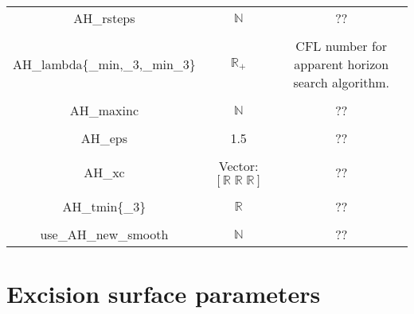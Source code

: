 \documentclass{article}
\begin{document}
\begin{table}[h]
\begin{tabular}{ccc}
      AH\_rsteps &
      $\mathbb{N}$
      &
      ??
      \\ \\
      AH\_lambda\{\_min,\_3,\_min\_3\}
      &
      $\mathbb{R}_+$
      &
      CFL number for apparent horizon search algorithm.
      \\ \\
      AH\_maxinc 
      &
      $\mathbb{N}$
      &
      ??
      \\ \\
      AH\_eps 
      &
      1.5
      &
      ??
      \\ \\
      AH\_xc &
      Vector: $\left[ 
         \mathbb{R} \; \mathbb{R} \; \mathbb{R} 
      \right]$
      &
      ??
      \\ \\ 
      AH\_tmin\{\_3\} 
      &
      $\mathbb{R}$
      &
      ??
      \\ \\ 
      use\_AH\_new\_smooth
      &
      $\mathbb{N}$
      &
      ??
   \end{tabular}
\end{table}

\newpage
\section*{Excision surface parameters}
\end{document}
